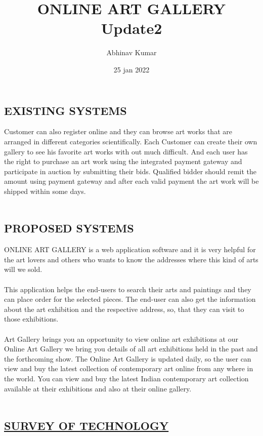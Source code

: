 \documentclass{article}
\title{ONLINE ART GALLERY \\ Update2}
\date{25 jan 2022}
\author{Abhinav Kumar }
\begin{document}
\maketitle
\begin{center}
   \section*{\textbf{EXISTING SYSTEMS}} 
\end{center}
Customer can also register online and they can browse art works that are arranged in different categories scientifically. Each Customer can create their own gallery to see his favorite art works with out much difficult. And each user has the right to purchase an art work using the integrated payment gateway and participate in auction by submitting their bids. Qualified bidder should remit the amount using payment gateway and after each valid payment the art work will be shipped within some days.
\\
\\
\begin{center}
   \section*{\textbf{PROPOSED SYSTEMS}} 
\end{center}
ONLINE ART GALLERY is a web application software and it is very helpful for the art lovers and others who wants to know the addresses where this kind of arts will we sold.
\\
\\
This application helps the end-users to search their arts and paintings and they can place order for the selected pieces. The end-user can also get the information about the art exhibition and the respective address, so, that they can visit to those exhibitions.
\\
\\
Art Gallery brings you an opportunity to view online art exhibitions at our Online Art Gallery  we bring you details of all art exhibitions held in the past and the forthcoming show. The Online Art Gallery is updated daily, so the user can view and buy the latest collection of contemporary art online from any where in the world. You can view and buy the latest Indian contemporary art collection available at their exhibitions and also at their online gallery.
\\
\\
\begin{center}
   \section*{\underline{\textbf{SURVEY OF TECHNOLOGY}}} 
\end{center}
\end{document}
